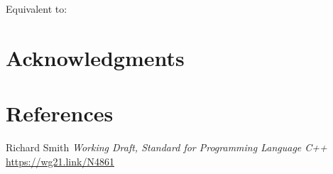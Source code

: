 \documentclass{wg21}
\begin{document}
\begin{itemdescr}
    \pnum
    \effects
    Equivalent to: 
\end{itemdescr}

\section{Acknowledgments}


\section{References}
\renewcommand{\section}[2]{}%



\begin{thebibliography}{9}

    Richard Smith
    \emph{Working Draft, Standard for Programming Language C++}\newline
    \url{https://wg21.link/N4861}

\end{thebibliography}
\end{document}
